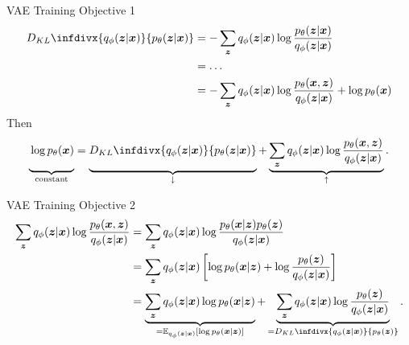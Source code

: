 \documentclass{beamer}
\newcommand{\kldiv}{D_{KL}\infdivx}
\begin{document}
    \begin{frame}{VAE Training Objective 1}
        \begin{align*}
            \kldiv{q_\phi(\bm{z}|\bm{x})}{p_\theta(\bm{z}|\bm{x})} &= -\sum_{\bm{z}} q_\phi(\bm{z}|\bm{x}) \log \frac{p_\theta(\bm{z}|\bm{x})}{q_\phi(\bm{z}|\bm{x})} \\
            &= \ldots \\
            &= -\sum_{\bm{z}} q_\phi(\bm{z}|\bm{x}) \log \frac{p_\theta(\bm{x},\bm{z})}{q_\phi(\bm{z}|\bm{x})} + \log p_\theta(\bm{x})
        \end{align*}
        Then
        \begin{align*}
            \underbrace{\vphantom{\sum_{\bm{z}} x}\log p_\theta(\bm{x})}_{\text{constant}} =  \underbrace{\vphantom{\sum_{\bm{z}} x}\kldiv{q_\phi(\bm{z}|\bm{x})}{p_\theta(\bm{z}|\bm{x})}}_{\downarrow}  + \underbrace{\sum_{\bm{z}} q_\phi(\bm{z}|\bm{x}) \log \frac{p_\theta(\bm{x},\bm{z})}{q_\phi(\bm{z}|\bm{x})}}_{\uparrow}.
        \end{align*}
    \end{frame}
    \begin{frame}{VAE Training Objective 2}
        \begin{align*}
            \sum_{\bm{z}} q_\phi(\bm{z}|\bm{x}) \log \frac{p_\theta(\bm{x},\bm{z})}{q_\phi(\bm{z}|\bm{x})} &= \sum_{\bm{z}} q_\phi(\bm{z}|\bm{x}) \log \frac{p_\theta(\bm{x}|\bm{z})p_\theta(\bm{z})}{q_\phi(\bm{z}|\bm{x})}\\
            &= \sum_{\bm{z}} q_\phi(\bm{z}|\bm{x}) \left[ \log p_\theta(\bm{x}|\bm{z}) + \log \frac{p_\theta(\bm{z})}{q_\phi(\bm{z}|\bm{x})} \right]\\
            &= \underbrace{\sum_{\bm{z}} q_\phi(\bm{z}|\bm{x})\log p_\theta(\bm{x}|\bm{z})}_{=\mathbb{E}_{q_\phi(\bm{z}|\bm{x})}\left[ \log p_\theta(\bm{x}|\bm{z}) \right]} + \underbrace{\sum_{\bm{z}} q_\phi(\bm{z}|\bm{x})\log \frac{p_\theta(\bm{z})}{q_\phi(\bm{z}|\bm{x})}}_{=\kldiv{q_\phi(\bm{z}|\bm{x})}{p_\theta(\bm{z})}}. \label{eq:elbo_error_term}
        \end{align*}
    \end{frame}
\end{document}
